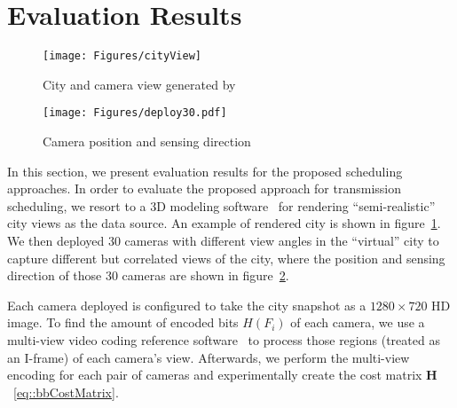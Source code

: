 \section{Evaluation Results}
\label{sec::evaluation}
%
\begin{figure}
\begin{center}
\texttt{[image: Figures/cityView]}
\caption{\label{fig::cityView}City and camera view generated by~\cite{Suicidator,Blender}}
\end{center}
\end{figure}
%
\begin{figure}
\begin{center}
\texttt{[image: Figures/deploy30.pdf]}
\caption{\label{fig::deploy30}Camera position and sensing direction}
\end{center}
\end{figure}
%
In this section, we present evaluation results for the proposed scheduling approaches.
In order to evaluate the proposed approach for transmission scheduling, we resort to a 3D modeling software~\cite{Suicidator,Blender} for rendering ``semi-realistic'' city views as the data source.
An example of rendered city is shown in figure~\ref{fig::cityView}.
We then deployed 30 cameras with different view angles in the ``virtual'' city to capture different but correlated views of the city, where the position and sensing direction of those 30 cameras are shown in figure~\ref{fig::deploy30}.

Each camera deployed is configured to take the city snapshot as a $1280 \times 720$ HD image.
To find the amount of encoded bits $H(F_i)$ of each camera, we use a multi-view video coding reference software~\cite{JMVC} to process those regions (treated as an I-frame) of each camera's view.
Afterwards, we perform the multi-view encoding for each pair of cameras and experimentally create the cost matrix $\mathbf{H}$~\eqref{eq::bbCostMatrix}.
%
